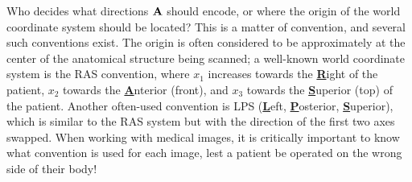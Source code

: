 \documentclass[10pt,twoside]{book}
\begin{document}
Who decides what directions $\mathbf{A}$ should encode, or where the origin of the world coordinate system should be located? This is a matter of convention, and several such conventions exist. The origin is often considered to be approximately at the center of the anatomical structure being scanned; a well-known world coordinate system is the RAS convention, where $x_1$ increases towards the \textbf{\underline{R}}ight of the patient, $x_2$ towards the \textbf{\underline{A}}nterior (front), and $x_3$ towards the \textbf{\underline{S}}uperior (top) of the patient. Another often-used convention is LPS (\textbf{\underline{L}}eft, \textbf{\underline{P}}osterior, \textbf{\underline{S}}uperior), which is similar to the RAS system but with the direction of the first two axes swapped.
When working with medical images, it is critically important to know what convention is used for each image, lest a patient be operated on the wrong side of their body!
\end{document}
